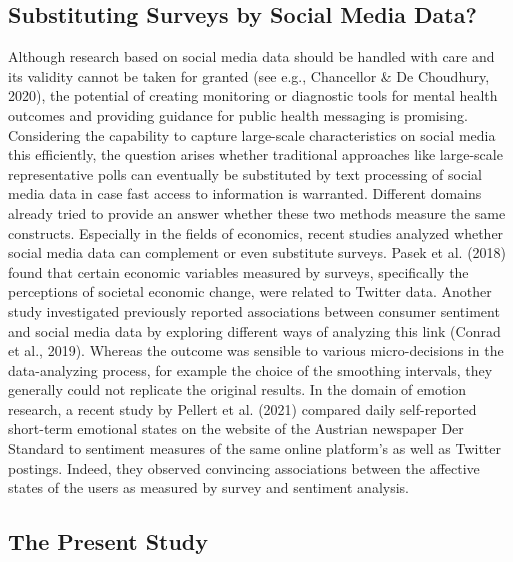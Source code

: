 \documentclass[
  english,
  jou,floatsintext]{apa7}
\begin{document}
\hypertarget{substituting-surveys-by-social-media-data}{%
\subsection{Substituting Surveys by Social Media Data?}\label{substituting-surveys-by-social-media-data}}

Although research based on social media data should be handled with care and its validity cannot be taken for granted (see e.g., Chancellor \& De Choudhury, 2020), the potential of creating monitoring or diagnostic tools for mental health outcomes and providing guidance for public health messaging is promising.
Considering the capability to capture large-scale characteristics on social media this efficiently, the question arises whether traditional approaches like large-scale representative polls can eventually be substituted by text processing of social media data in case fast access to information is warranted. Different domains already tried to provide an answer whether these two methods measure the same constructs. Especially in the fields of economics, recent studies analyzed whether social media data can complement or even substitute surveys. Pasek et al. (2018) found that certain economic variables measured by surveys, specifically the perceptions of societal economic change, were related to Twitter data. Another study investigated previously reported associations between consumer sentiment and social media data by exploring different ways of analyzing this link (Conrad et al., 2019). Whereas the outcome was sensible to various micro-decisions in the data-analyzing process, for example the choice of the smoothing intervals, they generally could not replicate the original results. In the domain of emotion research, a recent study by Pellert et al. (2021) compared daily self-reported short-term emotional states on the website of the Austrian newspaper Der Standard to sentiment measures of the same online platform's as well as Twitter postings. Indeed, they observed convincing associations between the affective states of the users as measured by survey and sentiment analysis.

\hypertarget{the-present-study}{%
\subsection{The Present Study}\label{the-present-study}}
\end{document}
